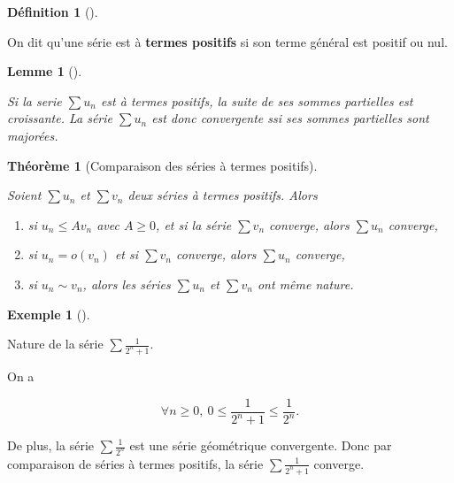 \documentclass[
  french,
  letterpaper,
  DIV=11,
  numbers=noendperiod]{scrreprt}
\providecommand{\tightlist}{%
  \setlength{\itemsep}{0pt}\setlength{\parskip}{0pt}}
\theoremstyle{plain}
\newtheorem{lemma}{Lemme}[chapter]
\theoremstyle{definition}
\newtheorem{definition}{Définition}[chapter]
\theoremstyle{plain}
\theoremstyle{plain}
\newtheorem{theorem}{Théorème}[chapter]
\theoremstyle{definition}
\theoremstyle{definition}
\newtheorem{example}{Exemple}[chapter]
\theoremstyle{plain}
\theoremstyle{remark}
\begin{document}
\begin{definition}[]\protect\hypertarget{def-serie-terme-positif}{}\label{def-serie-terme-positif}

On dit qu'une série est à \textbf{termes positifs} si son terme général
est positif ou nul.

\end{definition}

\begin{lemma}[]\protect\hypertarget{lem-croissante-majore}{}\label{lem-croissante-majore}

Si la serie \(\sum u_{n}\) est à termes \emph{positifs}, la suite de ses
sommes partielles est \emph{croissante}. La série \(\sum u_{n}\) est
donc convergente ssi ses sommes partielles sont \emph{majorées}.

\end{lemma}

\begin{theorem}[Comparaison des séries à termes
positifs]\protect\hypertarget{thm-comparaison-serie-terme-positif}{}\label{thm-comparaison-serie-terme-positif}

Soient \(\sum u_{n}\) et \(\sum v_{n}\) deux séries à termes
\emph{positifs}. Alors

\begin{enumerate}
\def\labelenumi{\arabic{enumi}.}
\tightlist
\item
  si \(u_{n} \leqslant Av_{n}\) avec \(A \geqslant 0\), et si la série
  \(\sum v_{n}\) converge, alors \(\sum u_{n}\) converge,
\item
  si \(u_{n}=o(v_{n})\) et si \(\sum v_{n}\) converge, alors
  \(\sum u_{n}\) converge,
\item
  si \(u_{n} \sim v_{n}\), alors les séries \(\sum u_{n}\) et
  \(\sum v_{n}\) ont même nature.
\end{enumerate}

\end{theorem}

\begin{example}[]\protect\hypertarget{exm-comparaison-1}{}\label{exm-comparaison-1}

Nature de la série \(\sum \frac{1}{2^{n}+1}\).

On a

\[
    \forall n \geqslant 0,\ 0 \leqslant \frac{1}{2^{n}+1}\leqslant \frac{1}{2^{n}}.
\]

De plus, la série \(\sum \frac{1}{2^{n}}\) est une série géométrique
convergente. Donc par comparaison de séries à termes positifs, la série
\(\sum
\frac{1}{2^{n}+1}\) converge.

\end{example}
\end{document}
